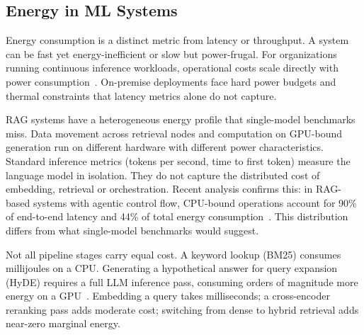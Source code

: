 \subsection{Energy in ML Systems}
\label{subsec:energy}



Energy consumption is a distinct metric from latency or throughput. A system
can be fast yet energy-inefficient or slow but power-frugal. For organizations
running continuous inference workloads, operational costs scale directly with power
consumption~\cite{energyml2024}. On-premise deployments face hard power budgets
and thermal constraints that latency metrics alone do not capture.

RAG systems have a heterogeneous energy profile that single-model benchmarks miss.
Data movement across retrieval nodes and computation on GPU-bound generation run on
different hardware with different power characteristics. Standard inference metrics
(tokens per second, time to first token) measure the language model in isolation.
They do not capture the distributed cost of embedding, retrieval or orchestration.
Recent analysis confirms this: in RAG-based systems with agentic control flow, CPU-bound
operations account for 90\% of end-to-end latency and 44\% of total energy
consumption~\cite{cpucentric2025}. This distribution differs from what single-model benchmarks would suggest.


Not all pipeline stages carry equal cost. A keyword lookup (BM25) consumes millijoules
on a CPU. Generating a hypothetical answer for query expansion (HyDE) requires a full
LLM inference pass, consuming orders of magnitude more energy on a
GPU~\cite{rago2025}. Embedding a query takes milliseconds; a cross-encoder reranking
pass adds moderate cost; switching from dense to hybrid retrieval adds near-zero marginal
energy. 

